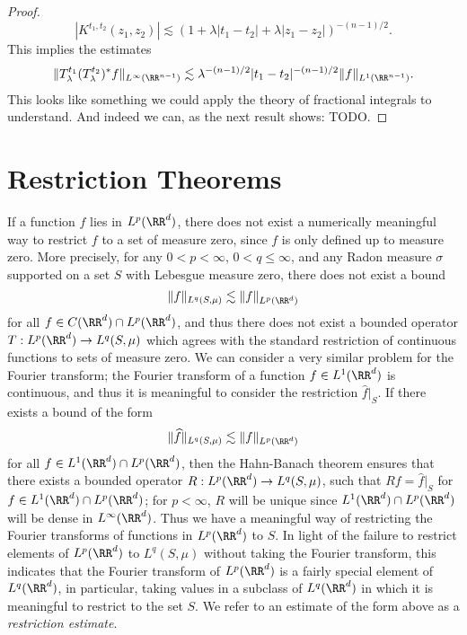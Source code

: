 \begin{proof}
    \[ |K^{t_1,t_2}(z_1,z_2)| \lesssim (1 + \lambda |t_1 - t_2| + \lambda |z_1 - z_2|)^{-(n-1)/2}. \]
    This implies the estimates
    \[ \| T_\lambda^{t_1} (T_\lambda^{t_2})^* f \|_{L^\infty(\RR^{n-1})} \lesssim \lambda^{-(n-1)/2} |t_1 - t_2|^{-(n-1)/2} \| f \|_{L^1(\RR^{n-1})}. \]
    This looks like something we could apply the theory of fractional integrals to understand. And indeed we can, as the next result shows: TODO.
\end{proof}








\chapter{Restriction Theorems}

If a function $f$ lies in $L^p(\RR^d)$, there does not exist a numerically meaningful way to restrict $f$ to a set of measure zero, since $f$ is only defined up to measure zero. More precisely, for any $0 < p < \infty$, $0 < q \leq \infty$, and any Radon measure $\sigma$ supported on a set $S$ with Lebesgue measure zero, there does not exist a bound
%
\[ \| f \|_{L^q(S,\mu)} \lesssim \| f \|_{L^p(\RR^d)} \]
%
for all $f \in C(\RR^d) \cap L^p(\RR^d)$, and thus there does not exist a bounded operator $T: L^p(\RR^d) \to L^q(S,\mu)$ which agrees with the standard restriction of continuous functions to sets of measure zero. We can consider a very similar problem for the Fourier transform; the Fourier transform of a function $f \in L^1(\RR^d)$ is continuous, and thus it is meaningful to consider the restriction $\widehat{f}|_S$. If there exists a bound of the form
%
\begin{equation}
  \| \widehat{f} \|_{L^q(S,\mu)} \lesssim \| f \|_{L^p(\RR^d)}
\end{equation}
%
for all $f \in L^1(\RR^d) \cap L^p(\RR^d)$, then the Hahn-Banach theorem ensures that there exists a bounded operator $R: L^p(\RR^d) \to L^q(S,\mu)$, such that $Rf = \widehat{f}|_S$ for $f \in L^1(\RR^d) \cap L^p(\RR^d)$; for $p < \infty$, $R$ will be unique since $L^1(\RR^d) \cap L^p(\RR^d)$ will be dense in $L^\infty(\RR^d)$. Thus we have a meaningful way of restricting the Fourier transforms of functions in $L^p(\RR^d)$ to $S$. In light of the failure to restrict elements of $L^p(\RR^d)$ to $L^q(S,\mu)$ without taking the Fourier transform, this indicates that the Fourier transform of $L^p(\RR^d)$ is a fairly special element of $L^q(\RR^d)$, in particular, taking values in a subclass of $L^q(\RR^d)$ in which it is meaningful to restrict to the set $S$. We refer to an estimate of the form above as a \emph{restriction estimate}.

